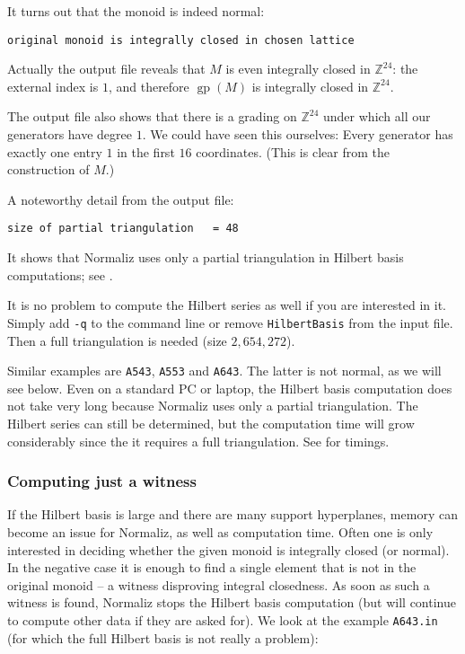 \documentclass[12pt,a4paper]{scrartcl}
\theoremstyle{definition}
\def\ZZ{{\mathbb Z}}
\DeclareMathOperator{\gp}{gp}
\begin{document}
It turns out that the monoid is indeed normal:
\begin{Verbatim}
original monoid is integrally closed in chosen lattice
\end{Verbatim}
Actually the output file reveals that $M$ is even integrally closed in $\ZZ^{24}$: the external index is $1$, and therefore $\gp(M)$ is integrally closed in $\ZZ^{24} $. 

The output file also shows that there is a grading on $\ZZ^{24}$ under which all our generators have degree $1$. We could have seen this ourselves: Every generator has exactly one entry $1$ in the first $16$ coordinates. (This is clear from the construction of $M$.)

A noteworthy detail from the output file:
\begin{Verbatim}
size of partial triangulation   = 48
\end{Verbatim}
It shows that Normaliz uses only a partial triangulation in Hilbert basis computations; see \cite{BHIKS}.

It is no problem to compute the Hilbert series as well if you are interested in it. Simply add \verb|-q| to the command line or remove \verb|HilbertBasis| from the input file. Then a full triangulation is needed (size $2,654,272$).

Similar examples are \verb|A543|, \verb|A553| and \verb|A643|. The latter is not normal, as we will see below. Even on a standard PC or laptop, the Hilbert basis computation does not take very long because Normaliz uses only a partial triangulation. The Hilbert series can still be determined, but the computation time will grow considerably since the it requires a full triangulation. See \cite{BIS} for timings.

\subsubsection{Computing just a witness}\label{IsIC}

If the Hilbert basis is large and there are many support hyperplanes, memory can become an issue for Normaliz, as well as computation time. Often one is only interested in deciding whether the given monoid is integrally closed (or normal). In the negative case it is enough to find a single element that is not in the original monoid -- a witness disproving integral closedness. As soon as such a witness is found, Normaliz stops the Hilbert basis computation (but will continue to compute other data if they are asked for). We look at the example \verb|A643.in| (for which the full Hilbert basis is not really a problem):
\end{document}
